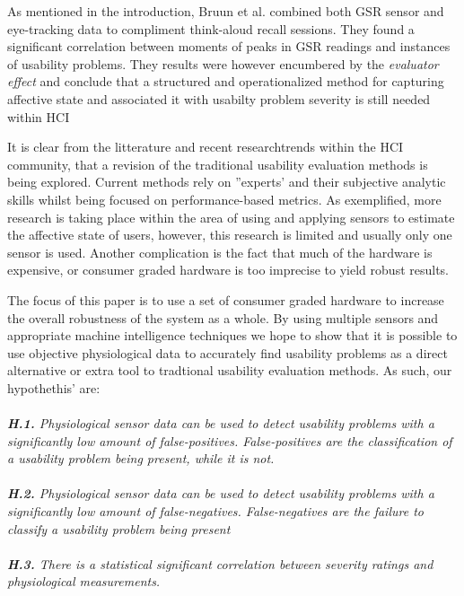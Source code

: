 As mentioned in the introduction, Bruun et al. combined both GSR sensor and
eye-tracking data to compliment think-aloud recall sessions. They found a
significant correlation between moments of peaks in GSR readings and instances
of usability problems. They results were however encumbered by the
\textit{evaluator effect} and conclude that a structured and operationalized
method for capturing affective state and associated it with usabilty problem
severity is still needed within HCI

It is clear from the litterature and recent researchtrends within the HCI community, that a revision of the traditional usability evaluation methods is being explored. 
Current methods rely on ''experts' and their subjective analytic skills whilst being focused on performance-based metrics.
As exemplified, more research is taking place within the area of using and applying sensors to estimate the affective state of users, however, this research is limited and usually only one sensor is used. 
Another complication is the fact that much of the hardware is expensive, or consumer graded hardware is too imprecise to yield robust results.

The focus of this paper is to use a set of consumer graded hardware to increase the overall robustness of the system as a whole. 
By using multiple sensors and appropriate machine intelligence techniques we hope to show that it is possible to use objective physiological data to accurately find usability problems as a direct alternative or extra tool to tradtional usability evaluation methods. 
As such, our hypothethis' are:\\\\

\textit{\textbf{H.1.} Physiological sensor data can be used to detect usability problems with a significantly low amount of false-positives. False-positives are the classification of a usability problem being present, while it is not.}\\\\
\textit{\textbf{H.2.} Physiological sensor data can be used to detect usability problems with
 a significantly low amount of false-negatives. False-negatives are the failure to classify a usability problem being present}\\\\
\textit{\textbf{H.3.} There is a statistical significant correlation between severity ratings and physiological measurements.}

